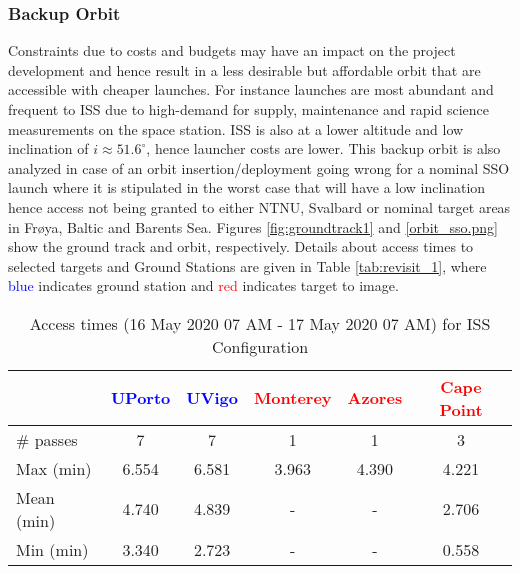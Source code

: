 \subsubsection{Backup Orbit} \label{sec:backup}
Constraints due to costs and budgets may have an impact on the project development and hence result in a less desirable but affordable orbit that are accessible with cheaper launches. For instance launches are most abundant and frequent to ISS due to high-demand for supply, maintenance and rapid science measurements on the space station. ISS is also at a lower altitude and low inclination of $i\approx 51.6^{\circ}$, hence launcher costs are lower. This backup orbit is also analyzed in case of an orbit insertion/deployment going wrong for a nominal SSO launch where it is stipulated in the worst case that \hypso will have a low inclination hence access not being granted to either NTNU, Svalbard or nominal target areas in Fr{\o}ya, Baltic and Barents Sea. Figures \ref{fig:groundtrack1} and \ref{orbit_sso.png} show the ground track and orbit, respectively. Details about access times to selected targets and Ground Stations are given in Table \ref{tab:revisit_1}, where \textcolor{blue}{blue} indicates ground station and \textcolor{red}{red} indicates target to image.
\begin{table}[htbp]
	\caption{Access times (16 May 2020 07 AM - 17 May 2020 07 AM) for ISS Configuration}
	\label{tab:revisit_2}
	\centering
		\begin{tabular}{|l|c|c|c|c|c|}
			\hline
			 & \textcolor{blue}{UPorto} & \textcolor{blue}{UVigo} & \textcolor{red}{Monterey} & \textcolor{red}{Azores} & \textcolor{red}{Cape Point} \\
					\hline
			\# passes & 7 & 7 & 1 & 1 & 3 \\
			Max (min) & 6.554 & 6.581 & 3.963 & 4.390 & 4.221 \\
			Mean (min) 	&	4.740	&	4.839 & - & - & 2.706 \\
			Min (min) & 3.340 & 2.723 & - & - & 0.558 \\
			\hline
		\end{tabular}
\end{table}

